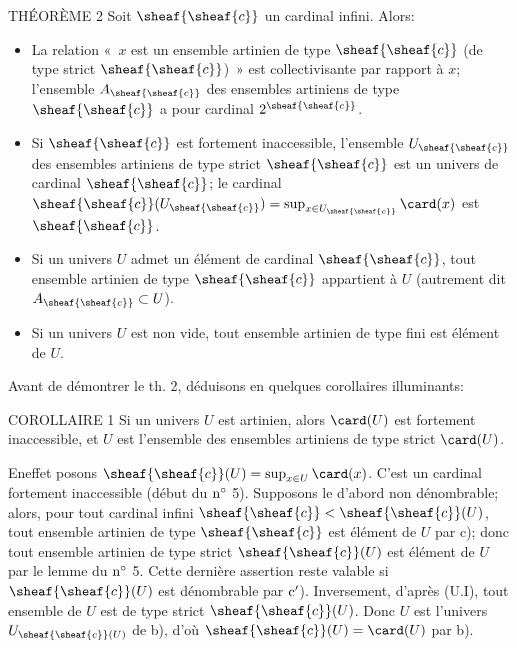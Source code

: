 \begin{enonce*}{THÉORÈME 2}
Soit $\sheaf{\sheaf{c}}$ un cardinal infini. Alors:
\begin{itemize}
\item[a)] La relation « $x$ est un ensemble artinien de type $\sheaf{\sheaf{c}}$
(\resp de type strict $\sheaf{\sheaf{c}}$) » %
est collectivisante par rapport à $x$; l'ensemble
$A_{\sheaf{\sheaf{c}}}$ des ensembles artiniens de type
$\sheaf{\sheaf{c}}$ a pour cardinal $2^{\sheaf{\sheaf{c}}}$.

\item[b)] Si $\sheaf{\sheaf{c}}$ est fortement inaccessible, l'ensemble
$U_{\sheaf{\sheaf{c}}}$ des ensembles artiniens de type strict
$\sheaf{\sheaf{c}}$ est un univers de cardinal $\sheaf{\sheaf{c}}$;
le cardinal $\sheaf{\sheaf{c}}(U_{\sheaf{\sheaf{c}}})=\sup_{x\in
U_{\sheaf{\sheaf{c}}}}\card(x)$ est $\sheaf{\sheaf{c}}$.

\item[c)] Si un univers $U$ admet un élément de cardinal $\sheaf{\sheaf{c}}$,
tout ensemble artinien de type $\sheaf{\sheaf{c}}$ appartient à $U$
(autrement dit $A_{\sheaf{\sheaf{c}}}\subset U$).

\item[${\rm c')}$] Si un univers $U$ est non vide, tout ensemble
artinien de type fini est élément de $U$.
\end{itemize}
\end{enonce*}
Avant de démontrer le th. 2, déduisons en quelques corollaires
illuminants:

\begin{enonce*}{COROLLAIRE 1}
Si un univers $U$ est artinien, alors $\card(U)$ est fortement
inaccessible, et $U$ est l'ensemble des ensembles artiniens de type
strict $\card(U)$.
\end{enonce*}

En\pageoriginale effet posons $\sheaf{\sheaf{c}}(U)=\sup_{x\in
U}\card(x)$. C'est un cardinal fortement inaccessible (début du
${\rm n^{\circ}}$ 5). Supposons le d'abord non dénombrable; alors,
pour tout cardinal infini $\sheaf{\sheaf{c}}<\sheaf{\sheaf{c}}(U)$,
tout ensemble artinien de type $\sheaf{\sheaf{c}}$ est élément de
$U$ par c); donc tout ensemble artinien de type strict
$\sheaf{\sheaf{c}}(U)$ est élément de $U$ par le lemme du ${\rm
n^{\circ}}$ 5. Cette dernière assertion reste valable si
$\sheaf{\sheaf{c}}(U)$ est dénombrable par ${\rm c'}$). Inversement,
d'après (U.I), tout ensemble de $U$ est de type strict
$\sheaf{\sheaf{c}}(U)$. Donc $U$ est l'univers
$U_{\sheaf{\sheaf{c}}(U)}$ de b), d'où
$\sheaf{\sheaf{c}}(U)=\card(U)$ par b).

